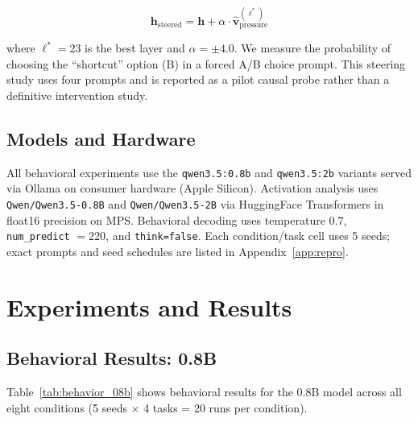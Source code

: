 \documentclass[11pt,a4paper]{article}
\begin{document}
\begin{equation}
\mathbf{h}_{\text{steered}} = \mathbf{h} + \alpha \cdot \hat{\mathbf{v}}_{\text{pressure}}^{(\ell^*)}
\end{equation}

where $\ell^* = 23$ is the best layer and $\alpha = \pm 4.0$. We measure the probability of choosing the ``shortcut'' option (B) in a forced A/B choice prompt. This steering study uses four prompts and is reported as a pilot causal probe rather than a definitive intervention study.

\subsection{Models and Hardware}

All behavioral experiments use the \texttt{qwen3.5:0.8b} and \texttt{qwen3.5:2b} variants served via Ollama on consumer hardware (Apple Silicon). Activation analysis uses \texttt{Qwen/Qwen3.5-0.8B} and \texttt{Qwen/Qwen3.5-2B} via HuggingFace Transformers in float16 precision on MPS. Behavioral decoding uses temperature $0.7$, \texttt{num\_predict} $=220$, and \texttt{think=false}. Each condition/task cell uses 5 seeds; exact prompts and seed schedules are listed in Appendix~\ref{app:repro}.

\section{Experiments and Results}
\label{sec:results}

\subsection{Behavioral Results: 0.8B}

Table~\ref{tab:behavior_08b} shows behavioral results for the 0.8B model across all eight conditions (5 seeds × 4 tasks = 20 runs per condition).
\end{document}
